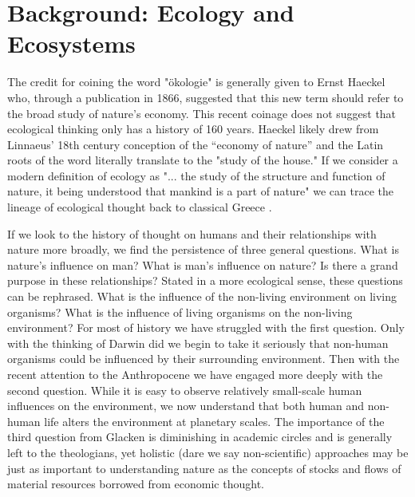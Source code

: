 \section {Background: Ecology and Ecosystems}

The credit for coining the word "ökologie" is generally given to Ernst Haeckel who, through a publication in 1866, suggested that this new term should refer to the broad study of nature's economy. This recent coinage does not suggest that ecological thinking only has a history of 160 years. Haeckel likely drew from Linnaeus’ 18th century conception of the “economy of nature” \citep{worster_1977} and the Latin roots of the word literally translate to the "study of the house." If we consider a modern definition of ecology as "... the study of the structure and function of nature, it being understood that mankind is a part of nature" we can trace the lineage of ecological thought back to classical Greece \citep[][p. 3]{odum_1953}. 

If we look to the history of thought on humans and their relationships with nature more broadly, we find the persistence of three general questions. What is nature's influence on man? What is man's influence on nature? Is there a grand purpose in these relationships\citep{glacken_1967}? Stated in a more ecological sense, these questions can be rephrased. What is the influence of the non-living environment on living organisms? What is the influence of living organisms on the non-living environment? For most of history we have struggled with the first question. Only with the thinking of Darwin did we begin to take it seriously that non-human organisms could be influenced by their surrounding environment. Then with the recent attention to the Anthropocene we have engaged more deeply with the second question. While it is easy to observe relatively small-scale human influences on the environment, we now understand that both human and non-human life alters the environment at planetary scales. The importance of the third question from Glacken is diminishing in academic circles and is generally left to the theologians, yet holistic (dare we say non-scientific) approaches may be just as important to understanding nature as the concepts of stocks and flows of material resources borrowed from economic thought. 

